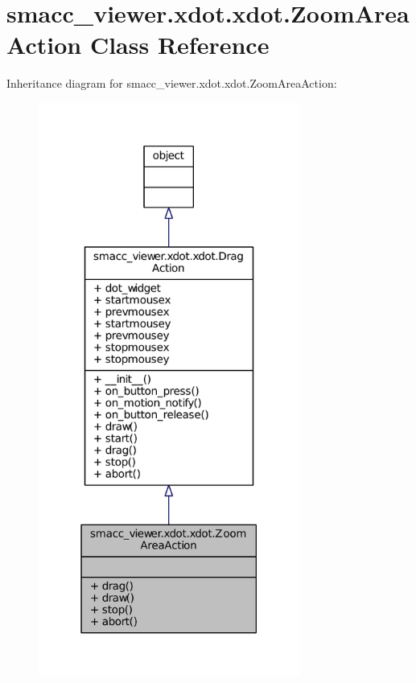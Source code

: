 \hypertarget{classsmacc__viewer_1_1xdot_1_1xdot_1_1ZoomAreaAction}{}\section{smacc\+\_\+viewer.\+xdot.\+xdot.\+Zoom\+Area\+Action Class Reference}
\label{classsmacc__viewer_1_1xdot_1_1xdot_1_1ZoomAreaAction}


Inheritance diagram for smacc\+\_\+viewer.\+xdot.\+xdot.\+Zoom\+Area\+Action\+:
\nopagebreak
\begin{figure}[H]
\begin{center}
\leavevmode
\includegraphics[width=243pt]{classsmacc__viewer_1_1xdot_1_1xdot_1_1ZoomAreaAction__inherit__graph}
\end{center}
\end{figure}


